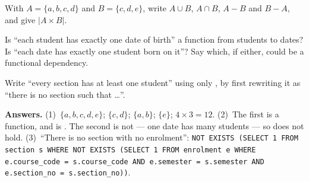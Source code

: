 \begin{conceptbox}
\begin{tightnum}
  \item With $A = \{a, b, c, d\}$ and $B = \{c, d, e\}$, write $A \cup B$,
        $A \cap B$, $A - B$ and $B - A$, and give $|A \times B|$.
  \item Is ``each student has exactly one date of birth'' a function from
        students to dates? Is ``each date has exactly one student born on
        it''? Say which, if either, could be a functional dependency.
  \item Write ``every section has at least one student'' using only
        , by first rewriting it as ``there is no section
        such that \dots''.
\end{tightnum}

\smallskip
\textbf{Answers.} (1)~$\{a,b,c,d,e\}$; $\{c,d\}$; $\{a,b\}$; $\{e\}$;
$4 \times 3 = 12$. (2)~The first is a function, and is
. The second is not --- one date has many
students --- so  does not hold. (3)~``There is no
section with no enrolment'': \texttt{NOT EXISTS (SELECT 1 FROM section s WHERE
NOT EXISTS (SELECT 1 FROM enrolment e WHERE e.course\_code = s.course\_code AND
e.semester = s.semester AND e.section\_no = s.section\_no))}.
\end{conceptbox}
